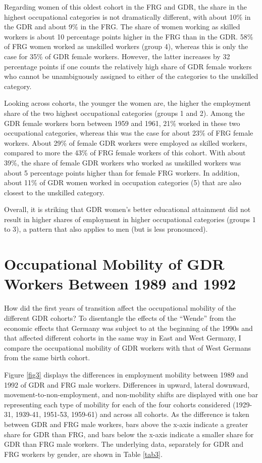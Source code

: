 \begin{Article}
\begin{refsection}[Spitz]
Regarding women of this oldest cohort in the FRG and GDR, the share in the highest occupational categories is not dramatically different, with about 10\% in the GDR and about 9\% in the FRG. The share of women working as skilled workers is about 10 percentage points higher in the FRG than in the GDR. 58\% of FRG women worked as unskilled workers (group 4), whereas this is only the case for 35\% of GDR female workers. However, the latter increases by 32 percentage points if one counts the relatively high share of GDR female workers who cannot be unambiguously assigned to either of the categories to the unskilled category. 

Looking across cohorts, the younger the women are, the higher the employment share of the two highest occupational categories (groups 1 and 2). Among the GDR female workers born between 1959 and 1961, 21\% worked in these two occupational categories, whereas this was the case for about 23\% of FRG female workers. About 29\% of female GDR workers were employed as skilled workers, compared to more the 43\% of FRG female workers of this cohort. With about 39\%, the share of female GDR workers who worked as unskilled workers was about 5 percentage points higher than for female FRG workers. In addition, about 11\% of GDR women worked in occupation categories (5) that are also closest to the unskilled category. 

Overall, it is striking that GDR women's better educational attainment did not result in higher shares of employment in higher occupational categories (groups 1 to 3), a pattern that also applies to men (but is less pronounced).


\section{Occupational Mobility of GDR Workers Between 1989 and 1992}\label{1989to1992}

How did the first years of transition affect the occupational mobility of the different GDR cohorts? To disentangle the effects of the ``Wende'' from the economic effects that Germany was subject to at the beginning of the 1990s and that affected different cohorts in the same way in East and West Germany, I compare the occupational mobility of GDR workers with that of West Germans from the same birth cohort.

Figure \ref{fig3} displays the differences in employment mobility between 1989 and 1992 of GDR and FRG male workers. Differences in upward, lateral downward, movement-to-non-employment, and non-mobility shifts are displayed with one bar representing each type of mobility for each of the four cohorts considered (1929-31, 1939-41, 1951-53, 1959-61) and across all cohorts. As the difference is taken between GDR and FRG male workers, bars above the x-axis indicate a greater share for GDR than FRG, and bars below the x-axis indicate a smaller share for GDR than FRG male workers. The underlying data, separately for GDR and FRG workers by gender, are shown in Table \ref{tab3}.


\end{refsection}
\end{Article}
